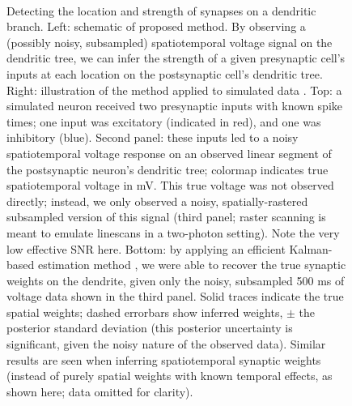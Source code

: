 \documentclass[12pt]{article}
\begin{document}
\begin{figure}[t!]
\begin{center}
\hbox{
\hspace{-1.8cm}
\epsfxsize=2in
\epsfxsize=5.6in
}
\caption{\small Detecting the location and strength of synapses on a
  dendritic branch.  Left: schematic of proposed method.  By observing
  a (possibly noisy, subsampled) spatiotemporal voltage signal on the
  dendritic tree, we can infer the strength of a given presynaptic
  cell's inputs at each location on the postsynaptic cell's dendritic
  tree.  Right: illustration of the method applied to simulated data
  \cite{PanFerr08}.  Top: a simulated neuron received two presynaptic
  inputs with known spike times; one input was excitatory (indicated
  in red), and one was inhibitory (blue).  Second panel: these inputs
  led to a noisy spatiotemporal voltage response on an observed linear
  segment of the postsynaptic neuron's dendritic tree; colormap
  indicates true spatiotemporal voltage in mV.  This true voltage was
  not observed directly; instead, we only observed a noisy,
  spatially-rastered subsampled version of this signal (third panel;
  raster scanning is meant to emulate linescans in a two-photon
  setting).  Note the very low effective SNR here.  Bottom: by
  applying an efficient Kalman-based estimation method \cite{PanBook},
  we were able to recover the true synaptic weights on the dendrite,
  given only the noisy, subsampled 500 ms of voltage data shown in the
  third panel.  Solid traces indicate the true spatial weights; dashed
  errorbars show inferred weights, $\pm$ the posterior standard
  deviation (this posterior uncertainty is significant, given the
  noisy nature of the observed data).  Similar results are seen when
  inferring spatiotemporal synaptic weights (instead of purely spatial
  weights with known temporal effects, as shown here; data omitted for
  clarity).}
\label{fig:synapse}
\end{center}
\end{figure}
\end{document}
